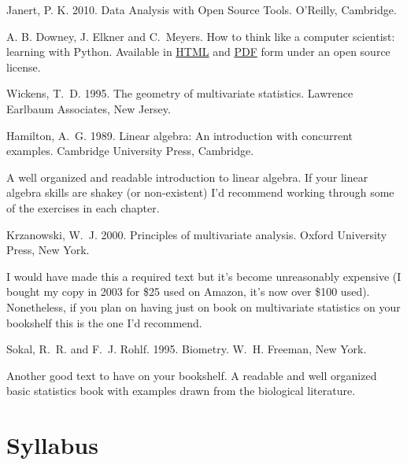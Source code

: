 \documentclass[11pt,letterpaper]{article}
\begin{document}
\renewcommand{\refname}{Texts}
\begin{thebibliography}{99}

 Janert, P. K. 2010. Data Analysis with Open Source Tools. O'Reilly, Cambridge.

A. B. Downey, J. Elkner  and C.\ Meyers. How to think like a computer scientist: learning with Python. Available in \href{http://www.greenteapress.com/thinkpython/html/index.html}{HTML} and \href{http://www.greenteapress.com/thinkpython/thinkpython.pdf}{PDF} form under an open source license.

 Wickens, T.\ D. 1995. The geometry of multivariate statistics. Lawrence Earlbaum Associates, New Jersey. 

\end{thebibliography}

\renewcommand{\refname}{Other Recommended Texts}

\begin{thebibliography}{99}
\setcounter{enumiv}{5}
 Hamilton, A.\ G. 1989. Linear algebra: An introduction with concurrent examples. Cambridge University Press, Cambridge.

A well organized and readable introduction to linear algebra. If your linear algebra skills are shakey (or non-existent) I'd recommend working through some of the exercises in each chapter.

 Krzanowski, W.\ J. 2000. Principles of multivariate analysis. Oxford University Press, New York.

I would have made this a required text but it's become unreasonably expensive (I bought my copy in 2003 for \$25 used on Amazon, it's now over \$100 used). Nonetheless, if you plan on having just on book on multivariate statistics on your bookshelf this is the one I'd recommend.

 Sokal, R.\ R. and F.\ J. Rohlf. 1995. Biometry. W.\ H. Freeman, New York.

Another good text to have on your bookshelf. A readable and well organized basic statistics book with examples drawn from the biological literature.

\end{thebibliography}

\section*{Syllabus}
\end{document}
